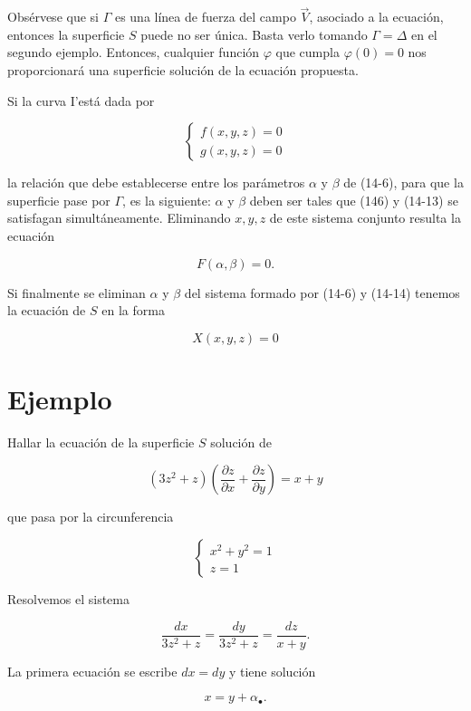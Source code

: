 \documentclass[10pt]{article}
\theoremstyle{plain}
\theoremstyle{definition}
\theoremstyle{remark}
\begin{document}
Obsérvese que si $\Gamma$ es una línea de fuerza del campo $\vec{V}$, asociado a la ecuación, entonces la superficie $S$ puede no ser única. Basta verlo tomando $\Gamma=\Delta$ en el segundo ejemplo. Entonces, cualquier función $\varphi$ que cumpla $\varphi(0)=0$ nos proporcionará una superficie solución de la ecuación propuesta.

Si la curva I'está dada por

\[
\left\{\begin{array}{l}
f(x, y, z)=0  \tag{14-13}\\
g(x, y, z)=0
\end{array}\right.
\]

la relación que debe establecerse entre los parámetros $\alpha$ y $\beta$ de (14-6), para que la superficie pase por $\Gamma$, es la siguiente: $\alpha$ y $\beta$ deben ser tales que (146) y (14-13) se satisfagan simultáneamente. Eliminando $x, y, z$ de este sistema conjunto resulta la ecuación


\begin{equation*}
F(\alpha, \beta)=0 . \tag{14-14}
\end{equation*}


Si finalmente se eliminan $\alpha$ y $\beta$ del sistema formado por (14-6) y (14-14) tenemos la ecuación de $S$ en la forma

$$
X(x, y, z)=0
$$

\section*{Ejemplo}
Hallar la ecuación de la superficie $S$ solución de


\begin{equation*}
\left(3 z^{2}+z\right)\left(\frac{\partial z}{\partial x}+\frac{\partial z}{\partial y}\right)=x+y \tag{14-15}
\end{equation*}


que pasa por la circunferencia

$$
\left\{\begin{array}{l}
x^{2}+y^{2}=1 \\
z=1
\end{array}\right.
$$

Resolvemos el sistema


$$
\frac{d x}{3 z^{2}+z}=\frac{d y}{3 z^{2}+z}=\frac{d z}{x+y} .
$$

La primera ecuación se escribe $d x=d y$ y tiene solución


\begin{equation*}
x=y+\alpha_{\bullet} . \tag{14-16}
\end{equation*}
\end{document}
